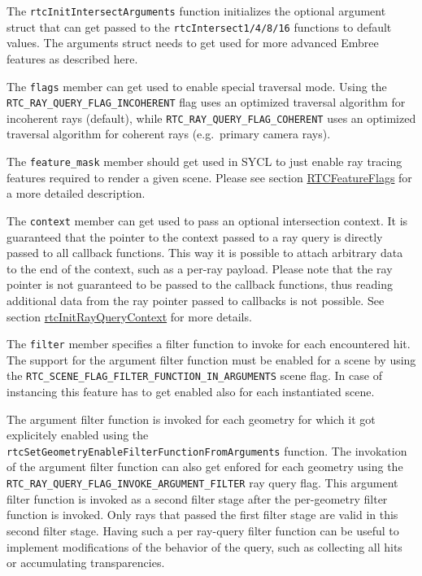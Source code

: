 The \texttt{rtcInitIntersectArguments} function initializes the optional
argument struct that can get passed to the \texttt{rtcIntersect1/4/8/16}
functions to default values. The arguments struct needs to get used for
more advanced Embree features as described here.

The \texttt{flags} member can get used to enable special traversal mode.
Using the \texttt{RTC\_RAY\_QUERY\_FLAG\_INCOHERENT} flag uses an
optimized traversal algorithm for incoherent rays (default), while
\texttt{RTC\_RAY\_QUERY\_FLAG\_COHERENT} uses an optimized traversal
algorithm for coherent rays (e.g.~primary camera rays).

The \texttt{feature\_mask} member should get used in SYCL to just enable
ray tracing features required to render a given scene. Please see
section \hyperref[rtcfeatureflags]{RTCFeatureFlags} for a more detailed
description.

The \texttt{context} member can get used to pass an optional
intersection context. It is guaranteed that the pointer to the context
passed to a ray query is directly passed to all callback functions. This
way it is possible to attach arbitrary data to the end of the context,
such as a per-ray payload. Please note that the ray pointer is not
guaranteed to be passed to the callback functions, thus reading
additional data from the ray pointer passed to callbacks is not
possible. See section
\hyperref[rtcinitrayquerycontext]{rtcInitRayQueryContext} for more
details.

The \texttt{filter} member specifies a filter function to invoke for
each encountered hit. The support for the argument filter function must
be enabled for a scene by using the
\texttt{RTC\_SCENE\_FLAG\_FILTER\_FUNCTION\_IN\_ARGUMENTS} scene flag.
In case of instancing this feature has to get enabled also for each
instantiated scene.

The argument filter function is invoked for each geometry for which it
got explicitely enabled using the
\texttt{rtcSetGeometryEnableFilterFunctionFromArguments} function. The
invokation of the argument filter function can also get enfored for each
geometry using the
\texttt{RTC\_RAY\_QUERY\_FLAG\_INVOKE\_ARGUMENT\_FILTER} ray query flag.
This argument filter function is invoked as a second filter stage after
the per-geometry filter function is invoked. Only rays that passed the
first filter stage are valid in this second filter stage. Having such a
per ray-query filter function can be useful to implement modifications
of the behavior of the query, such as collecting all hits or
accumulating transparencies.

